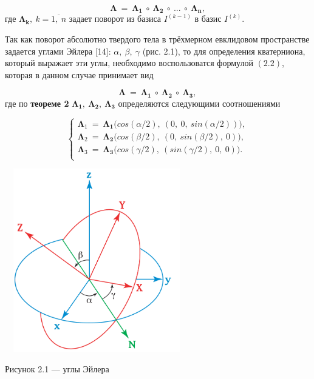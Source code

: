 \documentclass[14pt]{extreport}
\begin{document}
\begin{equation}
 \boldsymbol\Lambda\ =\ \boldsymbol{\Lambda_1}\ \circ\ \boldsymbol{\Lambda_2}\ \circ\ ...\ \circ\ \boldsymbol{\Lambda_n},
\end{equation}
где $\boldsymbol{\Lambda_k},\ k = \overline{1,\ n}$ задает поворот из базиса $I^{(k-1)}$ в базис $I^{(k)}$. 
\newline

Так как поворот абсолютно твердого тела в трёхмерном евклидовом пространстве задается углами Эйлера [14]: $\alpha,\ \beta,\ \gamma$ (рис. 2.1),
то для определения кватерниона, который выражает эти углы, необходимо воспользоватся формулой $(2.2)$, которая в данном случае принимает вид

\begin{equation}
 \boldsymbol\Lambda\ =\ \boldsymbol{\Lambda_1}\ \circ\ \boldsymbol{\Lambda_2}\ \circ\ \boldsymbol{\Lambda_3},
\end{equation}
где по \textbf{теореме 2} $\boldsymbol{\Lambda_1},\ \boldsymbol{\Lambda_2},\ \boldsymbol{\Lambda_3}$ определяются следующими соотношениями

\begin{equation}
\begin{cases}
 \boldsymbol\Lambda_1\ =\ \boldsymbol{\Lambda_1}\big(cos (\alpha/2),\ (0,\ 0,\ sin(\alpha/2))\big), \\ 
 \boldsymbol\Lambda_2\ =\ \boldsymbol{\Lambda_2}\big(cos (\beta/2),\ (0,\ sin(\beta/2),\ 0)\big), \\ 
 \boldsymbol\Lambda_3\ =\ \boldsymbol{\Lambda_3}\big(cos (\gamma/2),\ (sin(\gamma/2),\ 0,\ 0)\big). \\ 
\end{cases}
\end{equation}

\begin{center}
 \includegraphics[width=8cm, height=8cm]{1.png}
 
 Рисунок 2.1 --- углы Эйлера
\end{center}
\end{document}
